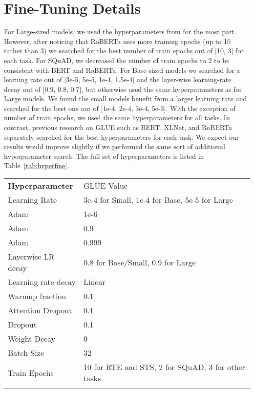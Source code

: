 \documentclass{article}
\newcommand\tstrut{\rule{0pt}{2.6ex}}
\newcommand\bstrut{\rule[-1.0ex]{0pt}{0pt}}
\newcommand{\thinline}{\Xhline{1.5\arrayrulewidth}}
\newcommand{\thickline}{\Xhline{2.5\arrayrulewidth}}
\newcommand{\tsep}	{\bstrut \\ \thinline}
\newcommand{\ttop}{\thickline}
\newcommand{\tbottom}{\bstrut \\ \thickline}
\begin{document}
\section{Fine-Tuning Details}
\label{app:fine}
For Large-sized models, we used the hyperparameters from \citet{Clark2019BAMBM} for the most part.
However, after noticing that RoBERTa \citep{liu2019roberta} uses more training epochs (up to 10 rather than 3) we searched for the best number of train epochs out of [10, 3] for each task. 
For SQuAD, we decreased the number of train epochs to 2 to be consistent with BERT and RoBERTa.
For Base-sized models we searched for a learning rate out of [3e-5, 5e-5, 1e-4, 1.5e-4] and the layer-wise learning-rate decay out of [0.9, 0.8, 0.7], but otherwise used the same hyperparameters as for Large models. 
We found the small models benefit from a larger learning rate and searched for the best one out of [1e-4, 2e-4, 3e-4, 5e-3].
With the exception of number of train epochs, we used the same hyperparameters for all tasks.
In contrast, previous research on GLUE such as BERT, XLNet, and RoBERTa separately searched for the best hyperparameters for each task. 
We expect our results would improve slightly if we performed the same sort of additional hyperparameter search.
The full set of hyperparameters is listed in Table~\ref{tab:hyperfine}.

\addtolength{\tabcolsep}{0pt}
\begin{table*}[t!]
\begin{center}
\begin{tabular}{l l}
\ttop
\textbf{Hyperparameter} & GLUE Value \tstrut \tsep
Learning Rate & 3e-4 for Small, 1e-4 for Base, 5e-5 for Large \tstrut \\
Adam  & 1e-6  \\
Adam  & 0.9  \\
Adam  & 0.999 \\
Layerwise LR decay & 0.8 for Base/Small, 0.9 for Large  \\
Learning rate decay & Linear \\
Warmup fraction & 0.1 \\
Attention Dropout & 0.1  \\
Dropout & 0.1  \\
Weight Decay & 0 \\
Batch Size & 32 \\
Train Epochs & 10 for RTE and STS, 2 for SQuAD, 3 for other tasks 
\tbottom
\end{tabular} 
\end{center}
\caption{Fine-tune hyperparameters}
\label{tab:hyperfine}
\end{table*}
\addtolength{\tabcolsep}{0pt}
\end{document}
